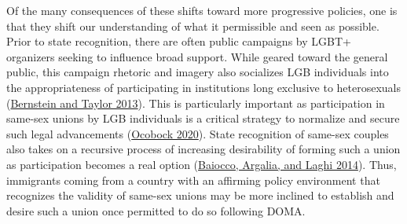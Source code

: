 \documentclass[
  12pt,
]{article}
\begin{document}
Of the many consequences of these shifts toward more progressive policies, one is that they shift our understanding of what it permissible and seen as possible. Prior to state recognition, there are often public campaigns by LGBT+ organizers seeking to influence broad support. While geared toward the general public, this campaign rhetoric and imagery also socializes LGB individuals into the appropriateness of participating in institutions long exclusive to heterosexuals (\protect\hyperlink{ref-bernstein_2013_marrying}{Bernstein and Taylor 2013}). This is particularly important as participation in same-sex unions by LGB individuals is a critical strategy to normalize and secure such legal advancements (\protect\hyperlink{ref-ocobock_2020_leveraging}{Ocobock 2020}). State recognition of same-sex couples also takes on a recursive process of increasing desirability of forming such a union as participation becomes a real option (\protect\hyperlink{ref-baiocco_2014_desire}{Baiocco, Argalia, and Laghi 2014}). Thus, immigrants coming from a country with an affirming policy environment that recognizes the validity of same-sex unions may be more inclined to establish and desire such a union once permitted to do so following DOMA.
\end{document}
